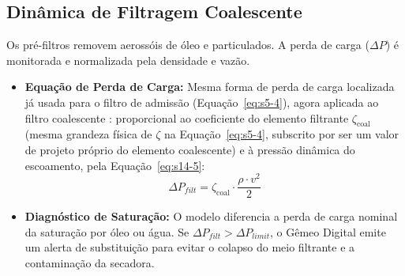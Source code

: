 \documentclass[12pt,a4paper]{article}
\numberwithin{equation}{section}
\numberwithin{table}{section}
\numberwithin{figure}{section}
\begin{document}
{	\subsection{Dinâmica de Filtragem Coalescente}
	Os pré-filtros removem aerossóis de óleo e particulados. A perda de carga ($\Delta P$) é monitorada e normalizada pela densidade e vazão.
	\begin{itemize}
		\item \textbf{Equação de Perda de Carga:} Mesma forma de perda de carga localizada já usada para o filtro de admissão (Equação~\eqref{eq:s5-4}), agora aplicada ao filtro coalescente \cite{atlascopco}: proporcional ao coeficiente do elemento filtrante $\zeta_{\text{coal}}$ (mesma grandeza física de $\zeta$ na Equação~\eqref{eq:s5-4}, subscrito por ser um valor de projeto próprio do elemento coalescente) e à pressão dinâmica do escoamento, pela Equação~\eqref{eq:s14-5}:
		\begin{equation}\label{eq:s14-5}
 \Delta P_{filt} = \zeta_{\text{coal}} \cdot \frac{\rho \cdot v^2}{2}
\end{equation}
		\item \textbf{Diagnóstico de Saturação:} O modelo diferencia a perda de carga nominal da saturação por óleo ou água. Se $\Delta P_{filt} > \Delta P_{limit}$, o Gêmeo Digital emite um alerta de substituição para evitar o colapso do meio filtrante e a contaminação da secadora.
	\end{itemize}
	
}
\end{document}
